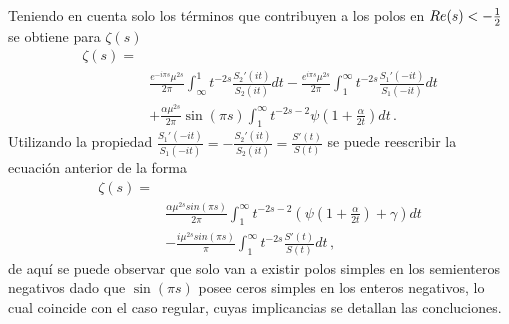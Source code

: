 Teniendo en cuenta solo los términos que contribuyen a los polos en  $R{\rm } e(s) < - \frac{1}{2}$ se obtiene para $\zeta (s)$
\begin{equation}
\begin{aligned}
 \zeta  (s) =& \\[10pt]
& \frac{e ^{- i \pi s} \mu ^{2s } }{2 \pi}
\int _{\infty} ^{1} t ^{-2s } 
		\frac{S _2' (it)}{S _2 (it)}
		d t
	- 
\frac{e ^{i \pi s} \mu ^{2s}}{2 \pi}
\int _{1} ^{\infty} t ^{-2s } 
	\frac{S _1 ' (-it)}{S _1 (-it)}
	d t 
	 \\[10pt]
	&  + \frac{\alpha \mu ^{2s} }{2 \pi }	\sin ( \pi s)  \int _1 ^{\infty}
	t ^{-2s-2}  \psi \left( 1 + \frac{\alpha}{2 t}\right) dt 
		\, .
\end{aligned}
\end{equation}
Utilizando la propiedad  $\frac{S _1 ' (-it)}{S _1 (-i t)} = - \frac{S _2 ' (i t)}{S _2 (it)} = \frac{S'(t)}{S(t)}  $ se puede reescribir la ecuación anterior de la forma
\begin{equation}
\begin{aligned}
\zeta  (s) =&  \\[5pt]
&
\frac{\alpha \mu ^{2s} sin( \pi s )}{2 \pi } \int _{1} ^{\infty} 
t ^{-2s-2} \left( \psi (1 + \frac{\alpha}{2 t}) + \gamma \right) dt 
\\[5pt]
& -  \frac{i \mu ^{2s}  sin (\pi s)}{\pi} \int _1 ^{\infty} t ^{-2s} \frac{S'(t)}{S(t)} dt 
	\, ,
\end{aligned}
\end{equation}
de aquí se puede observar que solo van a existir polos simples en los semienteros negativos dado que $\sin (\pi s)$ posee ceros simples en los enteros negativos, lo cual coincide con el caso regular, cuyas implicancias se detallan las concluciones.


